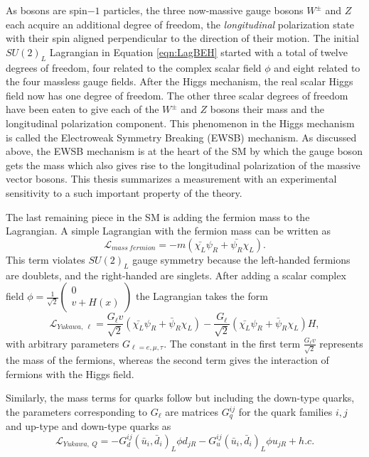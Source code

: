 As bosons are spin$-1$ particles, the three now-massive gauge bosons $W^{\pm}$ and $Z$ each acquire an additional degree of freedom, the \textit{longitudinal} polarization state with their spin aligned perpendicular to the direction of their motion. The initial $SU(2)_{L}$ Lagrangian in Equation \ref{eqn:LagBEH} started with a total of twelve degrees of freedom, four related to the complex scalar field $\phi$ and eight related to the four massless gauge fields. After the Higgs mechanism, the real scalar Higgs field now has one degree of freedom. The other three scalar degrees of freedom have been eaten to give each of the $W^{\pm}$ and $Z$ bosons their mass and the longitudinal polarization component. This phenomenon in the Higgs mechanism is called the Electroweak Symmetry Breaking (EWSB) mechanism. As discussed above, the EWSB mechanism is at the heart of the SM by which the gauge boson gets the mass which also gives rise to the longitudinal polarization of the massive vector bosons. This thesis summarizes a measurement with an experimental sensitivity to a such important property of the theory.

The last remaining piece in the SM is adding the fermion mass to the Lagrangian. A simple Lagrangian with the fermion mass can be written as 
\begin{equation}
\mathcal{L}_{mass~fermion} = -m(\bar{\chi_{L}}\psi_{R} + \bar{\psi_{R}}\chi_{L}).
\label{eqn:FermMass}
\end{equation}
This term violates $SU(2)_{L}$ gauge symmetry because the left-handed fermions are doublets, and the right-handed are singlets. After adding a scalar complex field $\phi =\frac{1}{\sqrt{2}} \begin{pmatrix} 0 \\ v+ H(x) \end{pmatrix}$ the Lagrangian takes the form 
\begin{equation}
\mathcal{L}_{Yukawa,~\ell} = \frac{G_{\ell}v}{\sqrt{2}} (\bar{\chi_{L}}\psi_{R} + \bar{\psi}_{R}\chi_{L} ) - \frac{G_{\ell}}{\sqrt{2}} (\bar{\chi_{L}}\psi_{R} + \bar{\psi}_{R}\chi_{L} )H,
\label{eqn:YukawaLepMass}
\end{equation}
with arbitrary parameters $G_{\ell =e,\mu,\tau}$. The constant in the first term $\frac{G_{\ell}v}{\sqrt{2}}$ represents the mass of the fermions, whereas the second term gives the interaction of fermions with the Higgs field. 

Similarly, the mass terms for quarks follow but including the down-type quarks, the parameters corresponding to $G_{\ell}$ are matrices $G^{ij}_{q}$ for the quark families $i,j$ and up-type and down-type quarks as
\begin{equation}
\mathcal{L}_{Yukawa,~Q} = -G^{ij}_{d}(\bar{u}_{i} , \bar{d}_{i} )_{L} \phi d_{jR} - G^{ij}_{u}(\bar{u}_{i} , \bar{d}_{i} )_{L} \phi u_{jR} + h.c.
\label{eqn:YukawaQuarkMass}
\end{equation}


